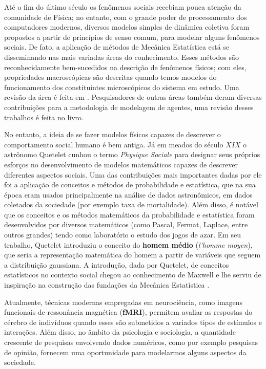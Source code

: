 Até o fim do último século os fenômenos sociais recebiam pouca atenção
da comunidade de Física; no entanto, com o grande poder de processamento
dos computadores modernos, diversos modelos simples de dinâmica
coletiva foram propostos a partir de princípios de senso comum, para
modelar alguns fenômenos sociais. De fato, a aplicação de métodos de
Mecânica Estatística está se disseminando nas mais variadas áreas do
conhecimento. Esses métodos são reconhecidamente bem-sucedidos na descrição
de fenômenos físicos; com eles, propriedades macroscópicas são descritas
quando temos modelos do funcionamento dos constituintes microscópicos do
sistema em estudo. Uma revisão da área é feita em .
Pesquisadores de outras áreas também deram diversas contribuições para a
metodologia de modelagem de agentes, uma revisão desses trabalhos é feita no
livro\cite{Epstein2011}.

No entanto, a ideia de se fazer modelos físicos capazes de descrever
o comportamento social humano  é bem antiga. Já em meados do século
$XIX$ o astrônomo Quetelet cunhou o termo \textit{Physique Sociale} para
designar seus próprios esforços no desenvolvimento de modelos matemáticos
capazes de descrever diferentes aspectos sociais\cite{Stewart1950}. Uma das
contribuições mais importantes dadas por ele foi a aplicação de conceitos
e métodos de probabilidade e estatística, que na sua época eram usados
principalmente na análise de dados astronômicos, em dados coletados da
sociedade (por exemplo taxa de mortalidade). Além disso, é notável que
os conceitos e os métodos matemáticos da probabilidade e estatística
foram desenvolvidos por diversos matemáticos (como Pascal, Fermat, Laplace,
entre outros grandes) tendo como laboratório o estudo dos jogos de azar. Em
seu trabalho, Quetelet introduziu o conceito do \textbf{homem médio}
(\textit{l'homme moyen}), que seria a representação matemática do homem a
partir de variáveis que seguem a distribuição gaussiana. A introdução,
dada por Quetelet, de conceitos estatísticos no contexto social chegou ao
conhecimento de Maxwell e lhe serviu de inspiração na construção das
fundações da Mecânica Estatística \cite{Finberg1992}.

Atualmente, técnicas modernas empregadas em neurociência, como imagens
funcionais de ressonância magnética (\textbf{fMRI}), permitem avaliar as
respostas do cérebro de indivíduos quando esses são submetidos a variados
tipos de estímulos e interações. Além disso, no âmbito da psicologia e
sociologia, a quantidade crescente de pesquisas envolvendo dados numéricos,
como por exemplo pesquisas de opinião, fornecem uma oportunidade para
modelarmos alguns aspectos da sociedade.

